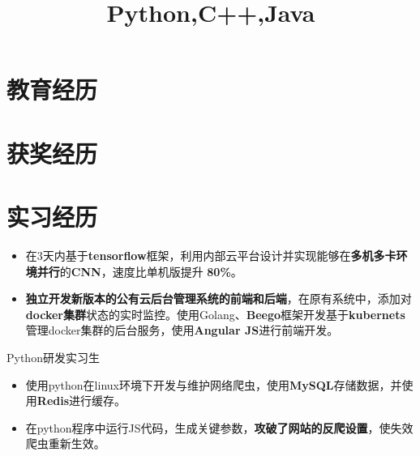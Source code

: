 \documentclass[11pt,a4paper]{moderncv}
\title{Python,C++,Java}
\begin{document}
\maketitle
\section{教育经历}

\section{获奖经历}

\section{实习经历}
{
\begin{itemize}
\item 在3天内基于\textbf{tensorflow}框架，利用内部云平台设计并实现能够在\textbf{多机多卡环境并行}的\textbf{CNN}，速度比单机版提升 \textbf{80\%}。
\item \textbf{独立开发新版本的公有云后台管理系统的前端和后端}，在原有系统中，添加对\textbf{docker集群}状态的实时监控。使用Golang、\textbf{Beego}框架开发基于\textbf{kubernets}管理docker集群的后台服务，使用\textbf{Angular JS}进行前端开发。
\end{itemize}}

 {Python研发实习生}{}{}
{\begin{itemize}
\item 使用python在linux环境下开发与维护网络爬虫，使用\textbf{MySQL}存储数据，并使用\textbf{Redis}进行缓存。
\item 在python程序中运行JS代码，生成关键参数，\textbf{攻破了网站的反爬设置}，使失效爬虫重新生效。
\end{itemize}}
\end{document}
